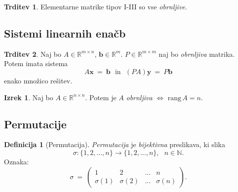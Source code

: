 \documentclass[11pt]{article}
\newcommand{\R}{\mathbb{R}}
\newcommand{\N}{\mathbb{N}}
\renewcommand{\b}{\mathbf{b}}
\newcommand{\x}{\mathbf{x}}
\newcommand{\y}{\mathbf{y}}
\newcommand{\0}{\mathbf{0}}
\newcommand{\rang}{\text{rang}\,}
\theoremstyle{definition}
\newtheorem{definicija}{Definicija}[section]
\theoremstyle{definition}
\newtheorem{trditev}{Trditev}[section]
\theoremstyle{definition}
\newtheorem{izrek}{Izrek}[section]
\theoremstyle{definition}
\begin{document}
\begin{trditev}

Elementarne matrike tipov I-III so vse \textit{obrnljive}.

\end{trditev}
\vspace{0.5cm}


\subsection{Sistemi linearnih enačb}
\vspace{0.5cm}

\begin{trditev}

Naj bo $A \in \R^{m \times n}$, $\b \in \R^m$. $P \in \R^{m \times m}$ naj bo \textit{obrnljiva} matrika. Potem imata sistema 
$$A\x ~=~ \b ~~~\text{in}~~~ (PA)\y ~=~ P\b$$
enako množico rešitev.

\end{trditev}
\vspace{0.5cm}

\begin{izrek}

Naj bo $A \in \R^{n \times n}$. Potem je $A$ \textit{obrnljiva} $\iff$ $\rang{A} = n$.

\end{izrek}
\vspace{0.5cm}


\subsection{Permutacije}
\vspace{0.5cm}

\begin{definicija}[Permutacija]

\textit{Permutacija} je \textit{bijektivna} preslikava, ki slika 
$$\sigma: \{1, 2, \ldots, n\} \rightarrow \{1, 2, \ldots, n\}, ~~~n \in \N.$$
Oznaka:
$$\sigma ~=~ \begin{pmatrix}
1 & 2 & \ldots & n \\
\sigma(1) & \sigma(2) & \ldots & \sigma(n)
\end{pmatrix}.$$

\end{definicija}
\vspace{0.5cm}
\end{document}
